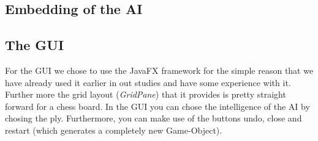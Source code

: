 \documentclass[final, paper=a4, paper=portrait, pagesize=auto, fontsize=10pt,english]{scrartcl}
\begin{document}
\subsection{Embedding of the AI}

\subsection{The GUI}
For the GUI we chose to use the JavaFX framework for the simple reason that we have already used it earlier in out studies and have some experience with it. Further more the grid layout (\textit{GridPane}) that it provides is pretty straight forward for a chess board. 
In the GUI you can chose the intelligence of the AI by chosing the ply. Furthermore, you can make use of the buttons undo, close and restart (which generates a completely new Game-Object).
\end{document}
